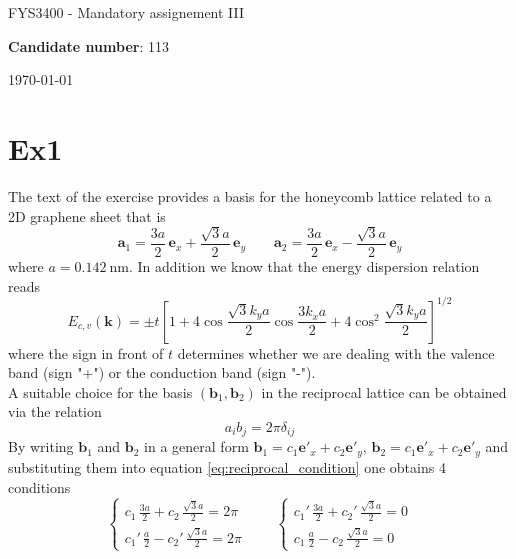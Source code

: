 \documentclass{article}
\newcommand{\ve}[1]{\mathbf{#1}}
\begin{document}
\begin{center}
    \centerline{\LARGE FYS3400 - Mandatory assignement III}
    \vspace{10pt}
    \centerline{\large\textbf{Candidate number}: 113}
    \vspace{10pt}
    \centerline{\today}
\end{center}

\section*{Ex1}
The text of the exercise provides a basis for the honeycomb lattice related to a 2D graphene sheet that is 
\begin{equation*}
    \ve a_1 = \frac{3a}{2} \, \ve e_x + \frac{\sqrt{3}a}{2} \, \ve e_y \qquad
    \ve a_2 = \frac{3a}{2} \, \ve e_x - \frac{\sqrt{3}a}{2} \, \ve e_y
\end{equation*}
where $a = \SI{0.142}{\nano\meter}$. In addition we know that the energy dispersion relation reads 
\begin{equation*}
    E_{c, v}(\mathbf{k})=\pm t\left[1+4 \cos \frac{\sqrt{3} k_y a}{2} \cos \frac{3 k_xa}{2}+4 \cos ^{2} \frac{\sqrt{3} k_y a}{2}\right]^{1 / 2}
\end{equation*}
where the sign in front of $t$ determines whether we are dealing with the valence band (sign "+") or the conduction band (sign "-"). \\
A suitable choice for the basis $(\ve b_1, \ve b_2)$ in the reciprocal lattice can be obtained via the relation
\begin{equation}
    a_i b_j = 2\pi \delta_{ij}
    \label{eq:reciprocal_condition}
\end{equation}
By writing $\ve b_1$ and $\ve b_2$ in a general form $\ve b_1 = c_1 \ve e'_x + c_2 \ve e'_y$, $\ve b_2 = c_1 \ve e'_x + c_2 \ve e'_y$ and substituting them into equation \ref{eq:reciprocal_condition} one obtains 4 conditions
\begin{equation*}
    \begin{cases}
        c_1 \, \frac{3a}{2} + c_2 \, \frac{\sqrt{3}a}{2} = 2\pi \\
        c_1' \, \frac{a}{2} - c_2' \, \frac{\sqrt{3}a}{2} = 2\pi
    \end{cases}
    \qquad
    \begin{cases}
        c_1' \, \frac{3a}{2} + c_2' \, \frac{\sqrt{3}a}{2} = 0 \\
        c_1 \, \frac{a}{2} - c_2 \, \frac{\sqrt{3}a}{2} = 0
    \end{cases}
\end{equation*}
\end{document}
